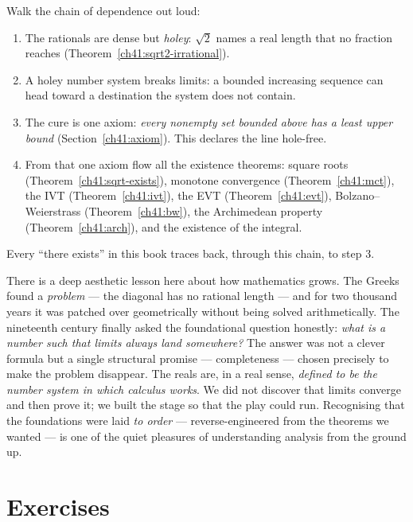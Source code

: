 \begin{walkbox}
Walk the chain of dependence out loud:
\begin{enumerate}
  \item The rationals are dense but \emph{holey}: $\sqrt 2$ names a real length that no
        fraction reaches (Theorem~\ref{ch41:sqrt2-irrational}).
  \item A holey number system breaks limits: a bounded increasing sequence can head toward
        a destination the system does not contain.
  \item The cure is one axiom: \emph{every nonempty set bounded above has a least upper
        bound} (Section~\ref{ch41:axiom}). This declares the line hole-free.
  \item From that one axiom flow all the existence theorems: square roots
        (Theorem~\ref{ch41:sqrt-exists}), monotone convergence (Theorem~\ref{ch41:mct}),
        the IVT (Theorem~\ref{ch41:ivt}), the EVT (Theorem~\ref{ch41:evt}),
        Bolzano--Weierstrass (Theorem~\ref{ch41:bw}), the Archimedean property
        (Theorem~\ref{ch41:arch}), and the existence of the integral.
\end{enumerate}
Every ``there exists'' in this book traces back, through this chain, to step 3.
\end{walkbox}

\begin{aestheticbox}
There is a deep aesthetic lesson here about how mathematics grows. The Greeks found a
\emph{problem} --- the diagonal has no rational length --- and for two thousand years it
was patched over geometrically without being solved arithmetically. The nineteenth century
finally asked the foundational question honestly: \emph{what is a number such that limits
always land somewhere?} The answer was not a clever formula but a single structural
promise --- completeness --- chosen precisely to make the problem disappear. The reals are,
in a real sense, \emph{defined to be the number system in which calculus works}. We did not
discover that limits converge and then prove it; we built the stage so that the play could
run. Recognising that the foundations were laid \emph{to order} --- reverse-engineered from
the theorems we wanted --- is one of the quiet pleasures of understanding analysis from the
ground up.
\end{aestheticbox}

\section{Exercises}
\label{ch41:exercises}


